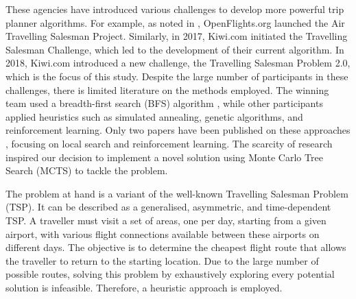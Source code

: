 These agencies have introduced various challenges to develop more powerful trip planner algorithms. For example, as noted in \cite{reinforcement_learning_yaro}, OpenFlights.org launched the Air Travelling Salesman Project. Similarly, in 2017, Kiwi.com initiated the Travelling Salesman Challenge, which led to the development of their current algorithm. In 2018, Kiwi.com introduced a new challenge, the Travelling Salesman Problem 2.0, which is the focus of this study. Despite the large number of participants in these challenges, there is limited literature on the methods employed. The winning team used a breadth-first search (BFS) algorithm \cite{tsp2_award}, while other participants applied heuristics such as simulated annealing, genetic algorithms, and reinforcement learning. Only two papers have been published on these approaches \cite{reinforcement_learning_yaro,local_search_yaro}, focusing on local search and reinforcement learning. The scarcity of research inspired our decision to implement a novel solution using Monte Carlo Tree Search (MCTS) to tackle the problem.

The problem at hand is a variant of the well-known Travelling Salesman Problem (TSP). It can be described as a generalised, asymmetric, and time-dependent TSP. A traveller must visit a set of areas, one per day, starting from a given airport, with various flight connections available between these airports on different days. The objective is to determine the cheapest flight route that allows the traveller to return to the starting location. Due to the large number of possible routes, solving this problem by exhaustively exploring every potential solution is infeasible. Therefore, a heuristic approach is employed.